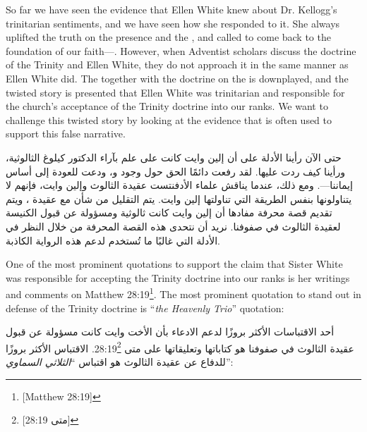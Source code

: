 



So far we have seen the evidence that Ellen White knew about Dr. Kellogg's trinitarian sentiments, and we have seen how she responded to it. She always uplifted the truth on the presence and the , and called to come back to the foundation of our faith—. However, when Adventist scholars discuss the doctrine of the Trinity and Ellen White, they do not approach it in the same manner as Ellen White did. The  together with the doctrine on the  is downplayed, and the twisted story is presented that Ellen White was trinitarian and responsible for the church's acceptance of the Trinity doctrine into our ranks. We want to challenge this twisted story by looking at the evidence that is often used to support this false narrative.


حتى الآن رأينا الأدلة على أن إلين وايت كانت على علم بآراء الدكتور كيلوغ الثالوثية، ورأينا كيف ردت عليها. لقد رفعت دائمًا الحق حول وجود و، ودعت للعودة إلى أساس إيماننا—. ومع ذلك، عندما يناقش علماء الأدفنتست عقيدة الثالوث وإلين وايت، فإنهم لا يتناولونها بنفس الطريقة التي تناولتها إلين وايت. يتم التقليل من شأن  مع عقيدة ، ويتم تقديم قصة محرفة مفادها أن إلين وايت كانت ثالوثية ومسؤولة عن قبول الكنيسة لعقيدة الثالوث في صفوفنا. نريد أن نتحدى هذه القصة المحرفة من خلال النظر في الأدلة التي غالبًا ما تُستخدم لدعم هذه الرواية الكاذبة.


One of the most prominent quotations to support the claim that Sister White was responsible for accepting the Trinity doctrine into our ranks is her writings and comments on Matthew 28:19\footnote{[Matthew 28:19]}. The most prominent quotation to stand out in defense of the Trinity doctrine is “\textit{the Heavenly Trio}” quotation:


أحد الاقتباسات الأكثر بروزًا لدعم الادعاء بأن الأخت وايت كانت مسؤولة عن قبول عقيدة الثالوث في صفوفنا هو كتاباتها وتعليقاتها على متى 28:19\footnote{[متى 28:19]}. الاقتباس الأكثر بروزًا للدفاع عن عقيدة الثالوث هو اقتباس “\textit{الثلاثي السماوي}”:


